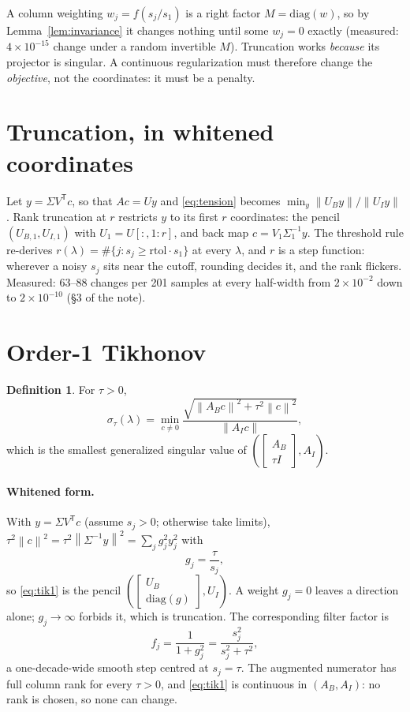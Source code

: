 \documentclass[11pt]{article}
\theoremstyle{definition}
\newtheorem{definition}{Definition}
\theoremstyle{remark}
\newcommand{\lam}{\lambda}
\newcommand{\sig}{\sigma}
\newcommand{\norm}[1]{\left\lVert #1 \right\rVert}
\newcommand{\AB}{A_B}
\newcommand{\AI}{A_I}
\begin{document}
A column weighting $w_j = f(s_j/s_1)$ is a right factor $M=\mathrm{diag}(w)$, so by
Lemma~\ref{lem:invariance} it changes nothing until some $w_j = 0$ exactly (measured: $4\times
10^{-15}$ change under a random invertible $M$). Truncation works \emph{because} its projector is
singular. A continuous regularization must therefore change the \emph{objective}, not the
coordinates: it must be a penalty.

\section{Truncation, in whitened coordinates}

Let $y = \Sigma V^{\mathsf T} c$, so that $Ac = Uy$ and \eqref{eq:tension} becomes
$\min_y \norm{U_B y}/\norm{U_I y}$. Rank truncation at $r$ restricts $y$ to its first $r$
coordinates: the pencil $(U_{B,1},U_{I,1})$ with $U_1 = U[:,1{:}r]$, and back map
$c = V_1\Sigma_1^{-1}y$. The threshold rule re-derives $r(\lam) = \#\{j: s_j \ge
\mathrm{rtol}\cdot s_1\}$ at every $\lam$, and $r$ is a step function: wherever a noisy $s_j$ sits
near the cutoff, rounding decides it, and the rank flickers. Measured: 63--88 changes per
201 samples at every half-width from $2\times10^{-2}$ down to $2\times10^{-10}$ (\S3 of the
note).

\section{Order-1 Tikhonov}

\begin{definition}
For $\tau>0$,
\begin{equation}\label{eq:tik1}
  \sig_\tau(\lam) = \min_{c\ne 0}
  \frac{\sqrt{\norm{\AB c}^2 + \tau^2\norm{c}^2}}{\norm{\AI c}},
\end{equation}
which is the smallest generalized singular value of $\left(\begin{bmatrix}\AB\\ \tau I\end{bmatrix},
\AI\right)$.
\end{definition}

\paragraph{Whitened form.} With $y=\Sigma V^{\mathsf T}c$ (assume $s_j>0$; otherwise take limits),
$\tau^2\norm{c}^2 = \tau^2\norm{\Sigma^{-1}y}^2 = \sum_j g_j^2 y_j^2$ with
\begin{equation}\label{eq:g1}
  g_j = \frac{\tau}{s_j},
\end{equation}
so \eqref{eq:tik1} is the pencil
$\left(\begin{bmatrix}U_B\\ \mathrm{diag}(g)\end{bmatrix}, U_I\right)$. A weight $g_j=0$ leaves a
direction alone; $g_j\to\infty$ forbids it, which is truncation. The corresponding filter factor is
\[
  f_j = \frac{1}{1+g_j^2} = \frac{s_j^2}{s_j^2+\tau^2},
\]
a one-decade-wide smooth step centred at $s_j=\tau$. The augmented numerator has full column rank
for every $\tau>0$, and \eqref{eq:tik1} is continuous in $(\AB,\AI)$: no rank is chosen, so none
can change.
\end{document}
